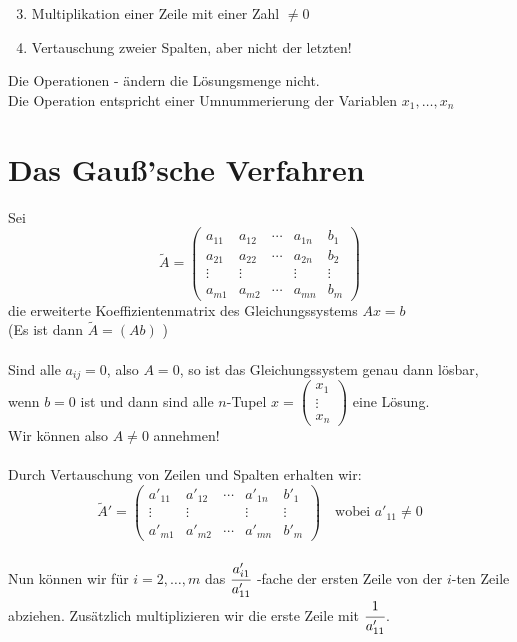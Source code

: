 \begin{enumerate}
\setcounter{enumi}{2}
\item Multiplikation einer Zeile mit einer Zahl \( \not= 0\)
\item Vertauschung zweier Spalten, aber nicht der letzten!
\end{enumerate}
Die Operationen - ändern die Lösungsmenge nicht. \\
Die Operation  entspricht einer Umnummerierung der Variablen \(x_1, \ldots, x_n \)
\newpage
\section{Das Gauß'sche Verfahren}
Sei
\[
\tilde A = 
\begin{pmatrix}
a_{11} & a_{12} & \cdots & a_{1n} & b_1 \\
a_{21} & a_{22} & \cdots & a_{2n} & b_2 \\
\vdots & \vdots & & \vdots & \vdots \\
a_{m1} & a_{m2} & \cdots & a_{mn} & b_m 
\end{pmatrix}
\]
die erweiterte Koeffizientenmatrix des Gleichungssystems \(Ax=b\) \\ 
(Es ist dann \(\tilde A = (Ab) \) ) \\
\\
Sind alle \(a_{ij} = 0\), also \(A=0\), so ist das Gleichungssystem genau dann lösbar, wenn \(b=0\) ist und dann sind alle \(n\)-Tupel \(x= \left( \begin{smallmatrix} x_1 \\ \vdots \\ x_n \end{smallmatrix} \right) \) eine Lösung. \\
Wir können also \(A \not= 0 \) annehmen! \\
\\
Durch Vertauschung von Zeilen und Spalten erhalten wir: 
\[
\tilde A' = 
\begin{pmatrix}
a'_{11} & a'_{12} & \cdots & a'_{1n} & b'_1 \\
\vdots & \vdots & & \vdots & \vdots \\
a'_{m1} & a'_{m2} & \cdots & a'_{mn} & b'_m 
\end{pmatrix}
\quad \text{wobei \(a'_{11} \not= 0 \)}
\]
\\
Nun können wir für \(i= 2, \ldots, m \) das \( \cfrac{a'_{i1}}{a'_{11}} \) -fache der ersten Zeile von der \(i\)-ten Zeile abziehen. Zusätzlich multiplizieren wir die erste Zeile mit \( \cfrac{1}{a'_{11}} \).
